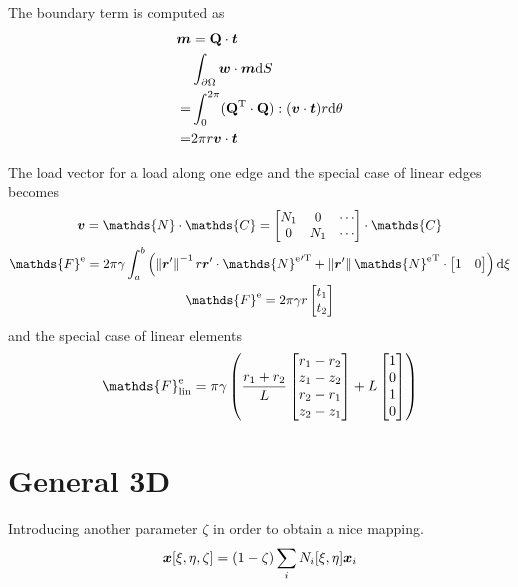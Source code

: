 \documentclass[a4paper,11pt]{article}
\renewcommand{\to}[1]{\text{\boldmath $#1$}} %
\newcommand{\ts}[1]{\text{\boldmath $\rm #1$}} %
\newcommand{\um}[1]{\mathds{#1}}
\newcommand{\intd}[1]{{\rm d}#1}
\newcommand{\norm}[1]{\left\lVert{#1}\right\rVert}
\newcommand{\T}{{\rm T}}
\newcommand{\element}{{\rm e}}
\newcommand{\linear}{{\rm lin}}
\begin{document}
The boundary term is computed as
\begin{align}
 \to m &= \ts Q\cdot \to t\\
 &\int_{\partial\Omega} \to w\cdot\to m\intd S\\
=&\int_0^{2\pi} (\ts Q^\T\cdot \ts Q):(\to v\cdot\to t) r \intd \theta\\
=& 2\pi r \to v \cdot \to t
\end{align}

The load vector for a load along one edge and the special case of linear edges becomes
\begin{gather}
 \to v = \um{N}\cdot\um{C} = \begin{bmatrix}N_1 & 0 & \cdots\\ 0 & N_1 & \cdots \end{bmatrix}\cdot \um{C}\\
 \um F^\element = 2\pi \gamma \int_a^b \left(\norm{\to r'}^{-1}r\to r'\cdot{\um N^\element}'^\T + \norm{\to r'}{\um N^\element}^\T\cdot\begin{bmatrix}1&0\end{bmatrix}\right) \intd\xi\\
 \um F^\element = 2\pi \gamma r \begin{bmatrix}t_1\\t_2\end{bmatrix}
\end{gather}
and the special case of linear elements
\begin{gather}
 \um F^\element_\linear = \pi \gamma \left(\frac{r_1+r_2}{L}\begin{bmatrix}r_1-r_2\\z_1-z_2\\r_2-r_1\\z_2-z_1\end{bmatrix} + L\begin{bmatrix}1\\0\\1\\0\end{bmatrix}\right)
\end{gather}

\section{General 3D}

Introducing another parameter $\zeta$ in order to obtain a nice mapping.
\begin{align}
 \to x[\xi,\eta,\zeta] = (1-\zeta)\sum_i N_i[\xi,\eta]\to x_i
\end{align}
\end{document}
